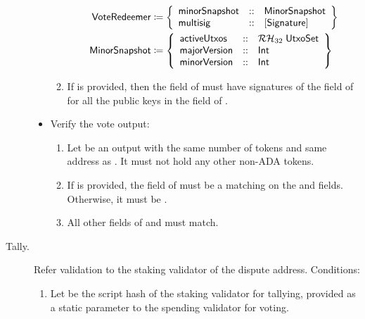 \documentclass[../hydrozoa.tex]{subfiles}
\begin{document}
\begin{description}
\begin{itemize}
\begin{enumerate}[resume]
\begin{equation*}
\begin{split}
              \mathsf{VoteRedeemer} &\coloneq \left\{
                \begin{array}{lll}
                  \mathsf{minorSnapshot} &::& \mathsf{MinorSnapshot} \\
                  \mathsf{multisig} &::& [\mathsf{Signature}]
                \end{array}\right\}\\
              \mathsf{MinorSnapshot} &\coloneq \left\{
              \begin{array}{lll}
                \mathsf{activeUtxos} &::& \mathcal{RH}_{32} \; \mathsf{UtxoSet} \\
                \mathsf{majorVersion} &::& \mathsf{Int} \\
                \mathsf{minorVersion} &::& \mathsf{Int}
              \end{array}\right\}
            \end{split}
            \end{equation*}
          \item If  is provided, then the  field of  must have signatures of the  field of  for all the public keys in the  field of .
        \end{enumerate}
      \item Verify the vote output:
        \begin{enumerate}[resume]
          \item Let  be an output with the same number of  tokens and same address as . It must not hold any other non-ADA tokens.
          \item If  is provided, the  field of  must be a  matching  on the  and  fields.
            Otherwise, it must be .
          \item All other fields of  and  must match.
        \end{enumerate}
    \end{itemize}
  \item[Tally.] Refer validation to the staking validator of the dispute address.
    Conditions:
    \begin{enumerate}
      \item Let  be the script hash of the staking validator for tallying, provided as a static parameter to the spending validator for voting.

\end{enumerate}
\end{description}
\end{document}
